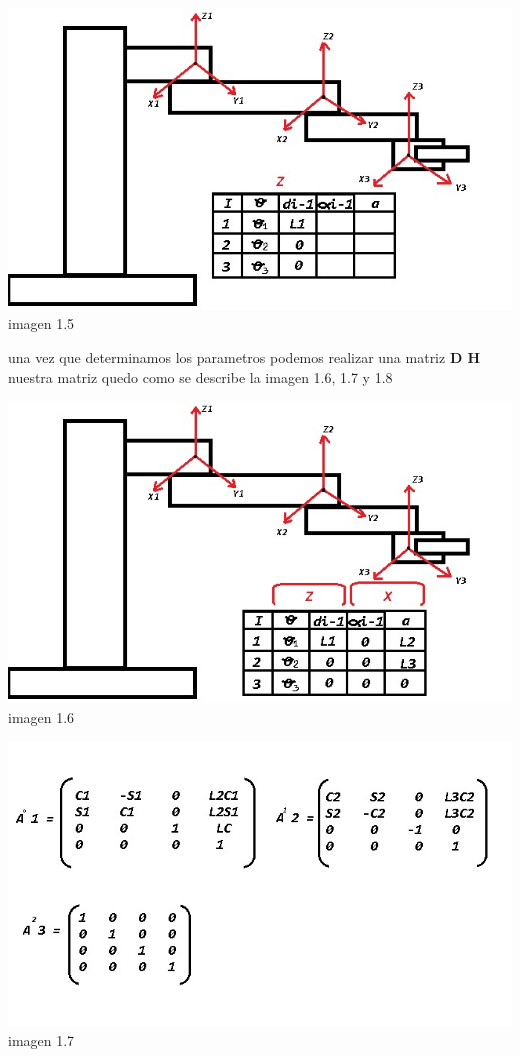 \documentclass[10pt,a4paper]{article}
\begin{document}
{\begin{center}\includegraphics[scale=0.5]{imagenes/C.png} imagen 1.5
\end{center}
{\Large una vez que determinamos los parametros podemos realizar una matriz \textbf{D H} nuestra matriz quedo como se describe la imagen 1.6, 1.7 y 1.8
\begin{center}
\includegraphics[scale=0.5]{imagenes/E.png} imagen 1.6
\end{center}
\begin{center}
\includegraphics[scale=0.65]{imagenes/F.png} imagen 1.7 

\end{center}}}
\end{document}
